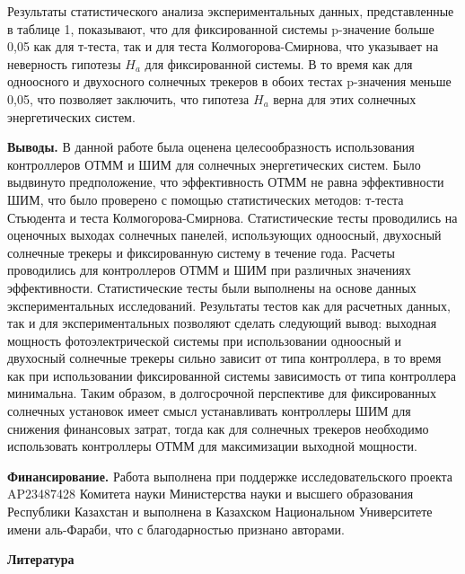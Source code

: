 \begin{multicols}{2}
Результаты статистического анализа экспериментальных данных,
представленные в таблице 1, показывают, что для фиксированной системы
p-значение больше 0,05 как для т-теста, так и для теста
Колмогорова-Смирнова, что указывает на неверность гипотезы \(H_{a}\) для
фиксированной системы. В то время как для одноосного и двухосного
солнечных трекеров в обоих тестах p-значения меньше 0,05, что позволяет
заключить, что гипотеза \(H_{a}\) верна для этих солнечных
энергетических систем.

{\bfseries Выводы.} В данной работе была оценена целесообразность
использования контроллеров ОТММ и ШИМ для солнечных энергетических
систем. Было выдвинуто предположение, что эффективность ОТММ не равна
эффективности ШИМ, что было проверено с помощью статистических методов:
т-теста Стьюдента и теста Колмогорова-Смирнова. Статистические тесты
проводились на оценочных выходах солнечных панелей, использующих
одноосный, двухосный солнечные трекеры и фиксированную систему в течение
года. Расчеты проводились для контроллеров ОТММ и ШИМ при различных
значениях эффективности. Статистические тесты были выполнены на основе
данных экспериментальных исследований. Результаты тестов как для
расчетных данных, так и для экспериментальных позволяют сделать
следующий вывод: выходная мощность фотоэлектрической системы при
использовании одноосный и двухосный солнечные трекеры сильно зависит от
типа контроллера, в то время как при использовании фиксированной системы
зависимость от типа контроллера минимальна. Таким образом, в
долгосрочной перспективе для фиксированных солнечных установок имеет
смысл устанавливать контроллеры ШИМ для снижения финансовых затрат,
тогда как для солнечных трекеров необходимо использовать контроллеры
ОТММ для максимизации выходной мощности.

{\bfseries Финансирование.} Работа выполнена при поддержке
исследовательского проекта AP23487428 Комитета науки Министерства науки
и высшего образования Республики Казахстан и выполнена в Казахском
Национальном Университете имени аль-Фараби, что с благодарностью
признано авторами.
\end{multicols}

\begin{center}
{\bfseries Литература}
\end{center}


